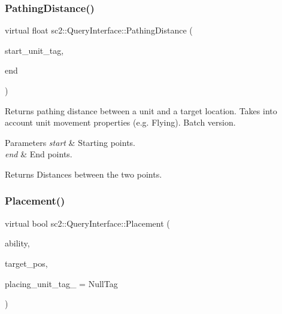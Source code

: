 \subsubsection{\texorpdfstring{Pathing\+Distance()}{PathingDistance()}\hspace{0.1cm}{\footnotesize\ttfamily [2/2]}}
{\footnotesize\ttfamily virtual float sc2\+::\+Query\+Interface\+::\+Pathing\+Distance (\begin{DoxyParamCaption}\item[{const Tag \&}]{start\+\_\+unit\+\_\+tag,  }\item[{const \hyperlink{structsc2_1_1_point2_d}{Point2D} \&}]{end }\end{DoxyParamCaption})\hspace{0.3cm}{\ttfamily [pure virtual]}}

Returns pathing distance between a unit and a target location. Takes into account unit movement properties (e.\+g. Flying). Batch version. 
\begin{DoxyParams}{Parameters}
{\em start} & Starting points. \\
\hline
{\em end} & End points. \\
\hline
\end{DoxyParams}
\begin{DoxyReturn}{Returns}
Distances between the two points. 
\end{DoxyReturn}
\mbox{\label{classsc2_1_1_query_interface_ae78a9660fc9f03b1676bacf47c9a9180}} 
\subsubsection{\texorpdfstring{Placement()}{Placement()}\hspace{0.1cm}{\footnotesize\ttfamily [1/2]}}
{\footnotesize\ttfamily virtual bool sc2\+::\+Query\+Interface\+::\+Placement (\begin{DoxyParamCaption}\item[{const \hyperlink{classsc2_1_1_s_c2_type}{Ability\+ID} \&}]{ability,  }\item[{const \hyperlink{structsc2_1_1_point2_d}{Point2D} \&}]{target\+\_\+pos,  }\item[{Tag}]{placing\+\_\+unit\+\_\+tag\+\_\+ = {\ttfamily NullTag} }\end{DoxyParamCaption})\hspace{0.3cm}{\ttfamily [pure virtual]}}

